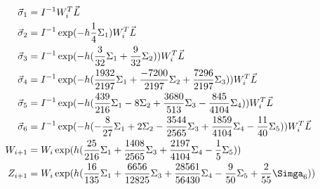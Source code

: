 \begin{equation}
\begin{aligned}
    \Vec{\sigma}_1 &= I^{-1}W^T_i\Vec{L}\\
    \Vec{\sigma}_2 &= I^{-1}\exp(-h\frac{1}{4}\Sigma_1)W^T_i\Vec{L}\\
    \Vec{\sigma}_3 &= I^{-1}\exp(-h(\frac{3}{32}\Sigma_1 + \frac{9}{32}\Sigma_2))W^T_i\Vec{L}\\
    \Vec{\sigma}_4 &= I^{-1}\exp(-h(\frac{1932}{2197}\Sigma_1 +\frac{-7200}{2197}\Sigma_2+\frac{7296}{2197}\Sigma_3))W^T_i\Vec{L}\\
    \Vec{\sigma}_5 &= I^{-1}\exp(-h(\frac{439}{216}\Sigma_1-8\Sigma_2+\frac{3680}{513}\Sigma_3-\frac{845}{4104}\Sigma_4))W^T_i\Vec{L}\\
    \Vec{\sigma}_6 &= I^{-1}\exp(-h(-\frac{8}{27}\Sigma_1+2\Sigma_2-\frac{3544}{2565}\Sigma_3+\frac{1859}{4104}\Sigma_4-\frac{11}{40}\Sigma_5))W^T_i\Vec{L}\\
    W_{i+1} &= W_i\exp(h(\frac{25}{216}\Sigma_1+\frac{1408}{2565}\Sigma_3+\frac{2197}{4104}\Sigma_4-\frac{1}{5}\Sigma_5))\\
    Z_{i+1} &= W_i\exp(h(\frac{16}{135}\Sigma_1+\frac{6656}{12825}\Sigma_3+\frac{28561}{56430}\Sigma_4-\frac{9}{50}\Sigma_5+\frac{2}{55}\Simga_6))\\
   
\end{aligned}
\end{equation}
